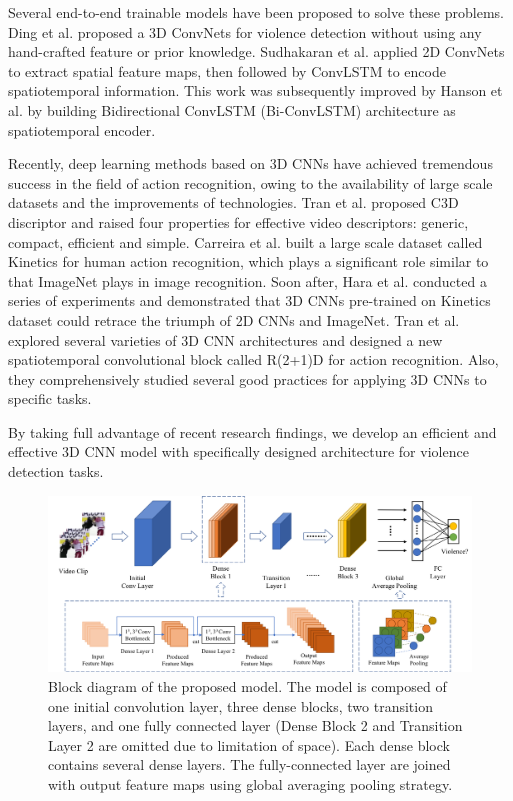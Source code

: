 \documentclass[10pt,twocolumn,letterpaper]{article}
\begin{document}
Several end-to-end trainable models have been proposed to solve these problems.
Ding et al. \cite{3dcnn_ding} proposed a 3D ConvNets for violence detection without using any hand-crafted feature or prior knowledge. 
Sudhakaran et al. \cite{convlstm_sudh} applied 2D ConvNets to extract spatial feature maps, then followed by ConvLSTM \cite{convlstm} to encode spatiotemporal information.
This work was subsequently improved by Hanson et al. \cite{bi_convlstm} by building Bidirectional ConvLSTM (Bi-ConvLSTM) architecture as spatiotemporal encoder.

Recently, deep learning methods based on 3D CNNs have achieved tremendous success in the field of action recognition, owing to the availability of large scale datasets and the improvements of technologies. 
Tran et al. \cite{3dcnn_1} proposed C3D discriptor and raised four properties for effective video descriptors: generic, compact, efficient and simple. 
Carreira et al. \cite{kinetics} built a large scale dataset called Kinetics for human action recognition, which plays a significant role similar to that ImageNet \cite{imagenet} plays in image recognition. 
Soon after, Hara et al. \cite{3dcnn_2} conducted a series of experiments and demonstrated that 3D CNNs pre-trained on Kinetics dataset could retrace the triumph of 2D CNNs and ImageNet.
Tran et al. \cite{r2+1d} explored several varieties of 3D CNN architectures and designed a new spatiotemporal convolutional block called R(2+1)D for action recognition.
Also, they comprehensively studied several good practices for applying 3D CNNs to specific tasks.

By taking full advantage of recent research findings, we develop an efficient and effective 3D CNN model with specifically designed architecture for violence detection tasks.




\begin{figure}
\begin{center}
\includegraphics[scale=0.52]{fig/fig1.png}
\end{center}
\caption{Block diagram of the proposed model. The model is composed of one initial convolution layer, three dense blocks, two transition layers, and one fully connected layer (Dense Block 2 and Transition Layer 2 are omitted due to limitation of space). Each dense block contains several dense layers. The fully-connected layer are joined with output feature maps using global averaging pooling strategy.}
\label{fig:model}
\end{figure}
	
\end{document}

